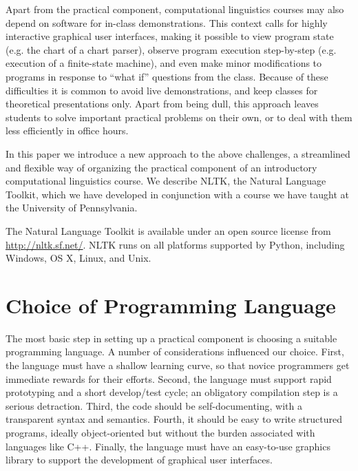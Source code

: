 \documentclass[11pt]{article}
\begin{document}
Apart from the practical component, computational linguistics courses
may also depend on software for in-class demonstrations.  This context
calls for highly interactive graphical user interfaces, making it
possible to view program state (e.g. the chart of a chart parser),
observe program execution step-by-step (e.g. execution of a
finite-state machine), and even make minor modifications to programs
in response to ``what if'' questions from the class.  Because of these
difficulties it is common to avoid live demonstrations, and keep
classes for theoretical presentations only.  Apart from being dull,
this approach leaves students to solve important practical problems on
their own, or to deal with them less efficiently in office hours.

In this paper we introduce a new approach to the above challenges, a
streamlined and flexible way of organizing the practical component of
an introductory computational linguistics course.  We describe NLTK,
the Natural Language Toolkit, which we have developed in conjunction
with a course we have taught at the University of Pennsylvania.

The Natural Language Toolkit is available under an open source license
from \mbox{\url{http://nltk.sf.net/}}.  NLTK runs on all platforms
supported by Python, including Windows, OS X, Linux, and Unix.

\section{Choice of Programming Language}
\label{sec:python}

The most basic step in setting up a practical component is choosing a
suitable programming language.  A number of considerations influenced
our choice.  First, the language must have a shallow learning curve,
so that novice programmers get immediate rewards for their efforts.
Second, the language must support rapid prototyping and a short
develop/test cycle; an obligatory compilation step is a serious
detraction.  Third, the code should be self-documenting, with a
transparent syntax and semantics.  Fourth, it should be easy to write
structured programs, ideally object-oriented but without the burden
associated with languages like C++.  Finally, the language must have
an easy-to-use graphics library to support the development of
graphical user interfaces.
\end{document}
